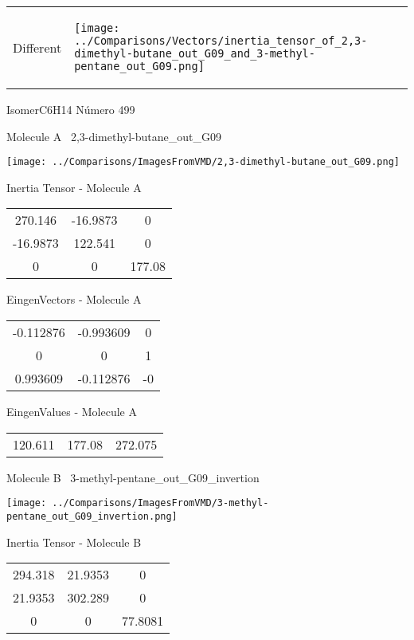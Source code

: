 \vtab[-5mm]
\begin{tabular}{*{2}{m{}}}
\begin{center}
\textcolor{NavyBlue}{\Large Different}
\end{center}
&
\begin{center}
\texttt{[image: ../Comparisons/Vectors/inertia\_tensor\_of\_2,3-dimethyl-butane\_out\_G09\_and\_3-methyl-pentane\_out\_G09.png]}
\end{center}
\end{tabular}

 \newpage

\vtab[-3cm]
\begin{center}
{\large IsomerC6H14 \tab Número 499}
\end{center}
\begin{multicols}{2}
\begin{center}

Molecule A \
2,3-dimethyl-butane\_out\_G09

\texttt{[image: ../Comparisons/ImagesFromVMD/2,3-dimethyl-butane\_out\_G09.png]}

Inertia Tensor - Molecule A \\
\begin{tabular}{|c c c|}
270.146	 & 	-16.9873	 & 	0	 \\
-16.9873	 & 	122.541	 & 	0	 \\
0	 & 	0	 & 	177.08
\end{tabular}

\vtab
 EingenVectors - Molecule A     \\
\begin{tabular}{|c c c|}
-0.112876	 & 	-0.993609	 & 	0	 \\
0	 & 	0	 & 	1	 \\
0.993609	 & 	-0.112876	 & 	-0
\end{tabular}

\vtab
 EingenValues - Molecule A     \\
\begin{tabular}{|c c c|}
120.611	 & 	177.08	 & 	272.075	 \\
\end{tabular}
\columnbreak

Molecule B \
3-methyl-pentane\_out\_G09\_invertion

\texttt{[image: ../Comparisons/ImagesFromVMD/3-methyl-pentane\_out\_G09\_invertion.png]}

Inertia Tensor - Molecule B \\
\begin{tabular}{|c c c|}
294.318	 & 	21.9353	 & 	0	 \\
21.9353	 & 	302.289	 & 	0	 \\
0	 & 	0	 & 	77.8081
\end{tabular}


\end{center}
\end{multicols}
